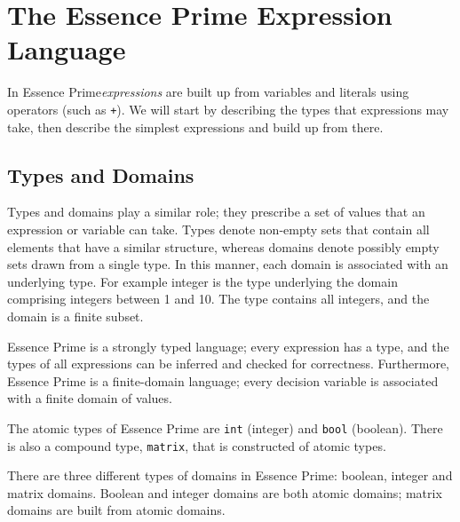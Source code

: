 \documentclass[a4paper]{article}
\newcommand{\eprime}{{\sc Essence Prime}\xspace}
\begin{document}
\section{The \eprime Expression Language}

In \eprime \textit{expressions} are built up from variables and literals using 
operators (such as \texttt{+}). We will start by describing the types
that expressions may take, then describe the simplest expressions and
build up from there. 

\subsection{Types and Domains}\label{sec:types-domains}

Types and domains play a similar role; they prescribe a set of
values that an expression or variable can take. Types denote non-empty sets that contain all elements
that have a similar structure, whereas domains denote possibly empty
sets drawn from a single type.  In this manner, each domain is associated with an
underlying type.  For example integer is the type underlying the
domain comprising integers between 1 and 10. The type contains all integers, 
and the domain is a finite subset. 

\eprime is a strongly typed language;
every expression has a type, and the types of all
expressions can be inferred and checked for correctness.
Furthermore, \eprime is a finite-domain language; every decision variable is
associated with a finite domain of values. 

The atomic types of \eprime are {\tt int} (integer) and {\tt bool} (boolean). 
There is also a compound type, \texttt{matrix},
that is constructed of atomic types.

There are three different types of domains in \eprime{}:
boolean, integer and matrix domains. Boolean and integer 
domains are both atomic domains; matrix domains are built from 
atomic domains.
\end{document}
